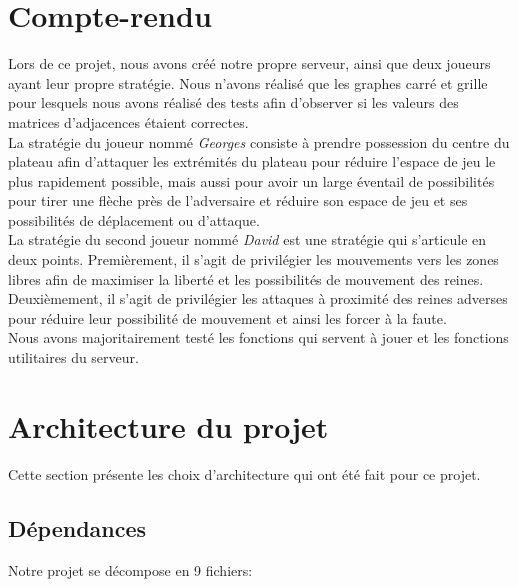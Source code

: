 \documentclass{article}
\begin{document}
\vspace{1cm}
\section{Compte-rendu}
Lors de ce projet, nous avons créé notre propre serveur, ainsi que deux joueurs ayant leur propre stratégie. Nous n'avons réalisé que les graphes carré et grille pour lesquels nous avons réalisé des tests afin d'observer si les valeurs des matrices d'adjacences étaient correctes.
\\La stratégie du joueur nommé \textit{Georges} consiste à prendre possession du centre du plateau afin d'attaquer les extrémités du plateau pour réduire l'espace de jeu le plus rapidement possible, mais aussi pour avoir un large éventail de possibilités pour tirer une flèche près de l'adversaire et réduire son espace de jeu et ses possibilités de déplacement ou d'attaque.
\\La stratégie du second joueur nommé \textit{David} est une stratégie qui s'articule en deux points. Premièrement, il s'agit de privilégier les mouvements vers les zones libres afin de maximiser la liberté et les possibilités de mouvement des reines. Deuxièmement, il s'agit de privilégier les attaques à proximité des reines adverses pour réduire leur possibilité de mouvement et ainsi les forcer à la faute.
\\Nous avons majoritairement testé les fonctions qui servent à jouer et les fonctions utilitaires du serveur.

\newpage
\section{Architecture du projet}
Cette section présente les choix d'architecture qui ont été fait pour ce projet.

\subsection{Dépendances}
Notre projet se décompose en 9 fichiers:
\end{document}
